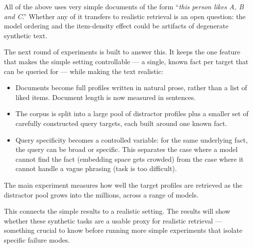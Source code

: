 \documentclass[11pt]{article}
\begin{document}
All of the above uses very simple documents of the form ``\textit{this person likes A, B and C}.'' Whether any of it transfers to realistic retrieval is an open question: the model ordering and the item-density effect could be artifacts of degenerate synthetic text.

The next round of experiments is built to answer this. It keeps the one feature that makes the simple setting controllable --- a single, known fact per target that can be queried for --- while making the text realistic:

\begin{itemize}
  \item Documents become full profiles written in natural prose, rather than a list of liked items. Document length is now measured in sentences.
  \item The corpus is split into a large pool of distractor profiles plus a smaller set of carefully constructed query targets, each built around one known fact.
  \item Query specificity becomes a controlled variable: for the same underlying fact, the query can be broad or specific. This separates the case where a model cannot find the fact (embedding space gets crowded) from the case where it cannot handle a vague phrasing (task is too difficult).
\end{itemize}

The main experiment measures how well the target profiles are retrieved as the distractor pool grows into the millions, across a range of models.

This connects the simple results to a realistic setting. The results will show whether these synthetic tasks are a usable proxy for realistic retrieval --- something crucial to know before running more simple experiments that isolate specific failure modes.
\end{document}
